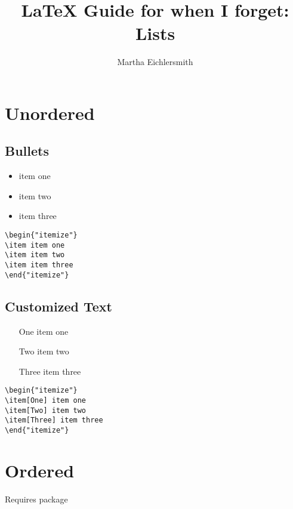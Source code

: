 \documentclass[12pt, letterpaper]{article}
\begin{document}
\title{LaTeX Guide for when I forget: Lists} 
\author{Martha Eichlersmith}
\maketitle 
\newpage 

\section{Unordered}
\subsection{Bullets} 
\begin{itemize}
	\item item one 
	\item item two
	\item item three
\end{itemize}
\begin{lstlisting}
\begin{"itemize"}
\item item one
\item item two
\item item three
\end{"itemize"}
\end{lstlisting}

\subsection{Customized Text}
\begin{itemize}
	\item[One] item one 
	\item[Two] item two
	\item[Three] item three
\end{itemize}
\begin{lstlisting}
\begin{"itemize"}
\item[One] item one 
\item[Two] item two
\item[Three] item three
\end{"itemize"}
\end{lstlisting}


\section{Ordered}
Requires  package
\end{document}
